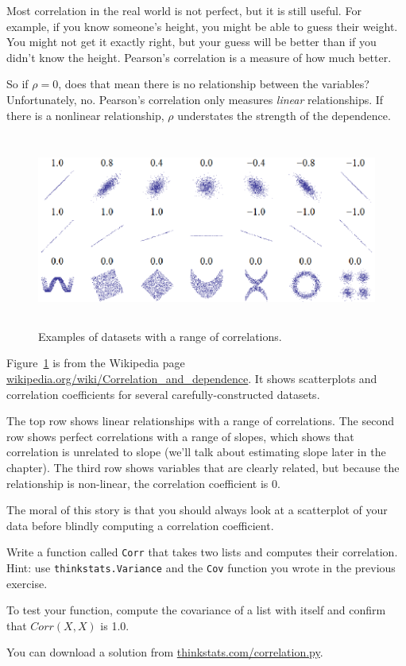 \documentclass[12pt]{book}
\begin{document}
Most correlation in the real world is not perfect, but it
is still useful.  For example, if you know someone's height, you might
be able to guess their weight.  You might not get it exactly right, but
your guess will be better than if you didn't know the height.
Pearson's correlation is a measure of how much better.

So if $\rho=0$, does that mean there is no
relationship between the variables?  Unfortunately, no.  Pearson's
correlation only measures {\em linear} relationships.  If there is a
nonlinear relationship, $\rho$ understates the strength of the
dependence.

\begin{figure}
\centerline{\includegraphics[height=2.5in]{figs/Correlation_examples.eps}}
\caption{Examples of datasets with a range of correlations.}
\label{corr_examples}
\end{figure}

Figure~\ref{corr_examples} is from the Wikipedia page
\url{wikipedia.org/wiki/Correlation_and_dependence}.  It shows
scatterplots and correlation coefficients for several
carefully-constructed datasets.

The top row shows linear relationships with a range
of correlations.  The second row shows perfect correlations with a range
of slopes, which shows that correlation is unrelated to slope
(we'll talk about estimating slope later in the chapter).  The third
row shows variables that are clearly related, but because the relationship
is non-linear, the correlation coefficient is 0.

The moral of this story is that you should always look at a scatterplot of
your data before blindly computing a correlation coefficient.

\begin{ex}

Write a function called {\tt Corr} that takes two lists and
computes their correlation.  Hint: use {\tt thinkstats.Variance} and
the {\tt Cov} function you wrote in the previous exercise.

To test your function, compute the covariance of a list with itself
and confirm that $Corr(X, X)$ is 1.0.

You can download a solution from \url{thinkstats.com/correlation.py}.

\end{ex}
\end{document}
